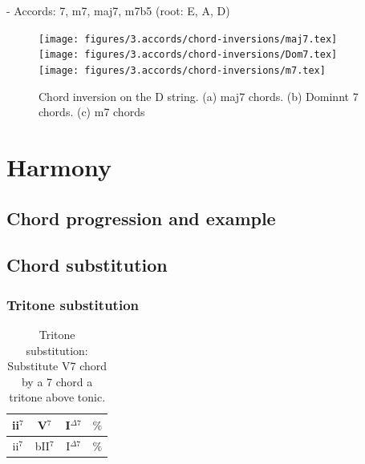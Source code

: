 \documentclass{article}
\begin{document}
- Accords: 7, m7, maj7, m7b5 (root: E, A, D)

\begin{figure}[h!]
	\centering
	\hspace*{-2.2cm}
	\texttt{[image: figures/3.accords/chord-inversions/maj7.tex]}
	\hspace*{-2.2cm}
	\texttt{[image: figures/3.accords/chord-inversions/Dom7.tex]}
	\hspace*{-2.2cm}
	\texttt{[image: figures/3.accords/chord-inversions/m7.tex]}
	\caption{Chord inversion on the D string. (a) maj7 chords. (b) Dominnt 7 chords. (c) m7 chords  }
	\label{fig}
\end{figure}

\newpage
\section{Harmony}
\subsection{Chord progression and example}



\subsection{Chord substitution}

\subsubsection{Tritone substitution}
\begin{table}[!h]
	\caption{Tritone substitution: Substitute V7 chord by a 7 chord a tritone above tonic.}
	\centering
	\begin{tabular}{| c | c | c | c |}
		\hline
		\phantom{x}ii$^7$\phantom{x} & \phantom{x}V$^7$\phantom{x} & \phantom{x}I$^{\Delta 7}$\phantom{x}  & \phantom{x}$\%$\phantom{x} \\
		\hline
		\phantom{x}ii$^7$\phantom{x} & \phantom{x}bII$^7$\phantom{x} & \phantom{x}I$^{\Delta 7}$\phantom{x}  & \phantom{x}$\%$\phantom{x} \\
		\hline
	\end{tabular}
	\label{tab:tritone-subs }
\end{table}
\end{document}
